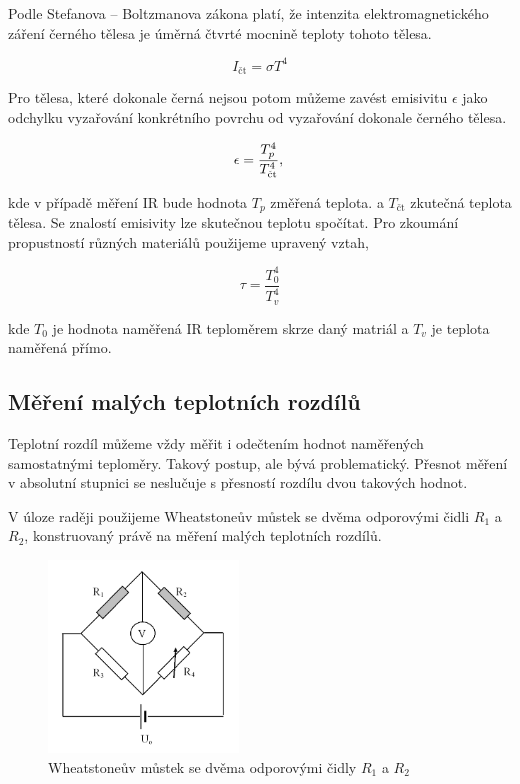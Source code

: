 \documentclass[a4paper,11pt]{article}
\begin{document}
Podle Stefanova – Boltzmanova zákona platí, že intenzita elektromagnetického záření černého tělesa je úměrná čtvrté mocnině teploty tohoto tělesa.

\begin{equation}
  I_{\text{čt}} = \sigma T^4 
\end{equation}

Pro tělesa, které dokonale černá nejsou potom můžeme zavést emisivitu $\epsilon$ jako
odchylku vyzařování konkrétního povrchu od vyzařování dokonale černého tělesa.

\begin{equation}
  \epsilon = \frac{T_p^4}{T_{\text{čt}}^4}, \\
\end{equation}

kde v případě měření IR bude hodnota $T_p$ změřená teplota. a $T_{\text{čt}}$ zkutečná teplota tělesa. 
Se znalostí emisivity lze skutečnou teplotu spočítat. 
Pro zkoumání propustností různých materiálů použijeme upravený vztah,

\begin{equation}
\tau = \frac{T_0^4}{T_v^4}
\end{equation}

kde $T_0$ je hodnota naměřená IR teploměrem skrze daný matriál a $T_v$ je teplota naměřená přímo.

\newpage

\subsection{Měření malých teplotních rozdílů}

Teplotní rozdíl můžeme vždy měřit i odečtením hodnot naměřených samostatnými teploměry. 
Takový postup, ale bývá problematický. Přesnot měření v absolutní stupnici se neslučuje s přesností rozdílu dvou takových hodnot.

V úloze raději použijeme Wheatstoneův můstek se dvěma odporovými čidli $R_1$ a $R_2$, konstruovaný právě na měření malých teplotních rozdílů.

\begin{figure}[ht]
  \centering
  \includegraphics[width=0.45\textwidth]{mustek_diagram.png}
  \caption{Wheatstoneův můstek se dvěma odporovými čidly $R_1$ a $R_2$}
\end{figure}
\end{document}
